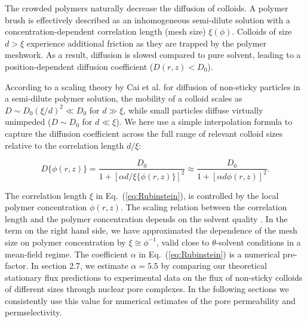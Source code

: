 \documentclass[12pt, a4paper]{article}
\begin{document}
The crowded polymers naturally decrease the diffusion of colloids.
A polymer brush is effectively described as an inhomogeneous semi-dilute solution with a concentration-dependent correlation length (mesh size) $\xi(\phi)$.
Colloids of size $d > \xi$ experience additional friction as they are trapped by the polymer meshwork.
As a result, diffusion is slowed compared to pure solvent, leading to a position-dependent diffusion coefficient ($D(r,z) < D_0$).

According to a scaling theory by Cai et al. \cite{Cai2011} for diffusion of non-sticky particles in a semi-dilute polymer solution, the mobility of a colloid scales as $D\sim D_0 (\xi/d)^2\ll D_0$ for $d\gg \xi$, while small particles diffuse virtually unimpeded ($D\sim D_0$ for $d\ll \xi$). We here use a simple interpolation formula to capture the diffusion coefficient across the full range of relevant colloid sizes relative to the correlation length $d / \xi$:

\begin{equation}
    D\{\phi(r,z)\} = \frac{D_0}{1+[\alpha d / \xi\{\phi(r,z)\}]^2} \approx \frac{D_0}{1+[\alpha d \phi(r,z)]^2} .
    \label{eq:Rubinstein}
\end{equation}

The correlation length $\xi$ in Eq.~(\ref{eq:Rubinstein}), is controlled by the local polymer concentration $\phi(r,z)$.
The scaling relation between the correlation length and the polymer concentration depends on the solvent quality \cite{DeGennes1979}.
In the term on the right hand side, we have approximated the dependence of the mesh size on polymer concentration by $\xi \cong \phi^{-1}$, valid close to $\theta$-solvent conditions in a mean-field regime.
The coefficient $\alpha$ in Eq.~(\ref{eq:Rubinstein}) is a numerical pre-factor.
In section 2.7, we estimate $\alpha = 5.5$ by comparing our theoretical stationary flux predictions to experimental data on the flux of non-sticky colloids of different sizes through nuclear pore  complexes.
In the following sections we consistently use this value for numerical estimates of the pore permeability and permselectivity.  
\end{document}
